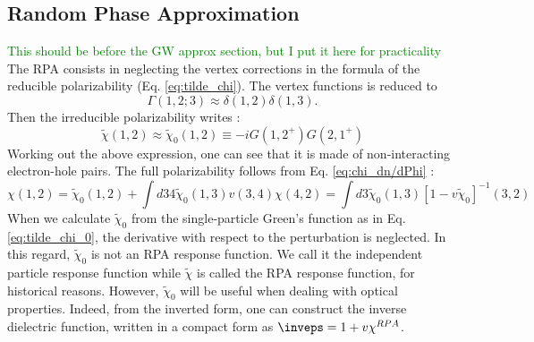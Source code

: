 \subsection{Random Phase Approximation} 
\textcolor{green}{This should be before the GW approx section, but I put it here for practicality}
The \gls{RPA} consists in neglecting the vertex corrections in the formula of the reducible polarizability (Eq. \eqref{eq:tilde_chi}). The vertex functions is reduced to 
\begin{equation}
	\Gamma(1,2;3) \approx \delta(1,2)\delta(1,3).
\end{equation}
Then the irreducible polarizability writes :
\begin{equation}
	\tilde{\chi}(1,2) \approx \tilde{\chi}_0(1,2) \equiv -i G(1,2^+)G(2,1^+) \label{eq:tilde_chi_0}
\end{equation}
Working out the above expression, one can see that it is made of non-interacting electron-hole pairs. The full polarizability follows from Eq. \eqref{eq:chi_dn/dPhi} :
\begin{equation}
	\chi(1,2) = \tilde{\chi}_0(1,2) + \int d34 \tilde{\chi}_0(1,3) v(3,4) \chi(4,2) = \int d3 \tilde{\chi}_0(1,3) \left[ 1 - v \tilde{\chi}_0\right]^{-1}(3,2)
\end{equation}
When we calculate $\tilde{\chi}_0$ from the single-particle Green's function as in Eq. \eqref{eq:tilde_chi_0}, the derivative with respect to the perturbation is neglected. In this regard, $\tilde{\chi}_0$ is not an \gls{RPA} response function. We call it the independent particle response function while $\tilde{\chi}$ is called the RPA response function, for historical reasons.
However, $\tilde{\chi}_0$ will be useful when dealing with optical properties. Indeed, from the inverted form, one can construct the inverse dielectric function, written in a compact form as $\inveps = 1+v \chi^{RPA}$.


